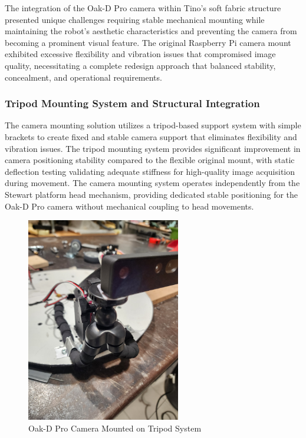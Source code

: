 The integration of the Oak-D Pro camera within Tino's soft fabric structure presented unique challenges requiring stable mechanical mounting while maintaining the robot's aesthetic characteristics and preventing the camera from becoming a prominent visual feature. The original Raspberry Pi camera mount exhibited excessive flexibility and vibration issues that compromised image quality, necessitating a complete redesign approach that balanced stability, concealment, and operational requirements.

\subsubsection{Tripod Mounting System and Structural Integration}

The camera mounting solution utilizes a tripod-based support system with simple brackets to create fixed and stable camera support that eliminates flexibility and vibration issues. The tripod mounting system provides significant improvement in camera positioning stability compared to the flexible original mount, with static deflection testing validating adequate stiffness for high-quality image acquisition during movement. The camera mounting system operates independently from the Stewart platform head mechanism, providing dedicated stable positioning for the Oak-D Pro camera without mechanical coupling to head movements.

\begin{figure}[H]
    \centering
    \includegraphics[width=0.6\textwidth, angle=-90]{Images/TripodOnHeadCamera.jpg}
    \caption{Oak-D Pro Camera Mounted on Tripod System}
    \label{fig:tripod_camera_mount}
\end{figure}

